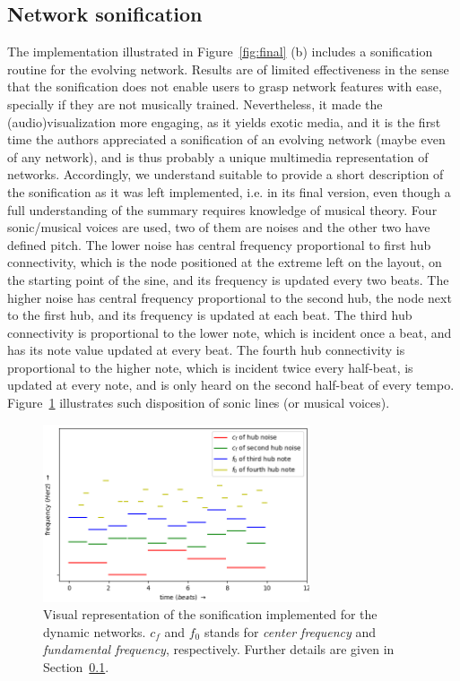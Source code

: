 \documentclass[runningheads]{llncs}
\begin{document}
\subsection{Network sonification}\label{sson}
The implementation illustrated in Figure~\ref{fig:final} (b) includes a sonification routine for the evolving network.
Results are of limited effectiveness in the sense that the sonification does not enable users to grasp network features with ease,
specially if they are not musically trained.
Nevertheless, it made the (audio)visualization more engaging, as it yields exotic media,
and it is the first time the authors appreciated a sonification of an evolving network (maybe even of any network),
and is thus probably a unique multimedia representation of networks.
Accordingly, we understand suitable to provide a short description of the sonification as it was left implemented,
i.e. in its final version,
even though a full understanding of the summary requires knowledge of musical theory.
Four sonic/musical voices are used, two of them are noises and the other two have defined pitch. The lower noise has central frequency proportional to first hub connectivity,
which is the node positioned at the extreme left on the layout, on the starting point of the sine, and its frequency is updated every two beats.
The higher noise has central frequency proportional to the second hub, the node next to the first hub, and its frequency is updated at each beat.
The third hub connectivity is proportional to the lower note,
which is incident once a beat, and has its note value updated at every beat.
The fourth hub connectivity is proportional to the higher note, which is incident twice every half-beat, is updated at every note, and is only heard on the second half-beat of every tempo.
Figure~\ref{fson} illustrates such disposition of sonic lines (or musical voices).

\begin{figure}[!h]\centering
\includegraphics[width=0.7\textwidth]{sonif}
  \caption{Visual representation of the sonification implemented for the dynamic networks.
  $c_f$ and $f_0$ stands for \emph{center frequency} and \emph{fundamental frequency}, respectively.
  Further details are given in Section~\ref{sson}.
  }\label{fson}
\end{figure}
\end{document}
